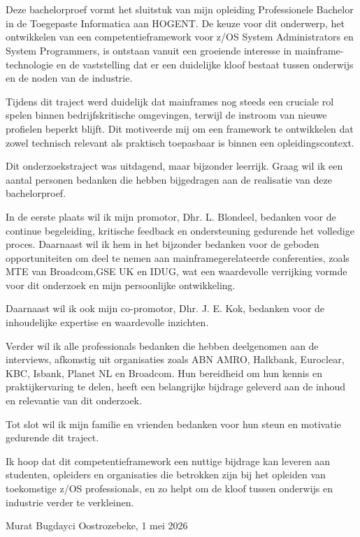 
\chapter*{}%
\label{ch:voorwoord}


Deze bachelorproef vormt het sluitstuk van mijn opleiding Professionele Bachelor in de Toegepaste Informatica aan HOGENT. De keuze voor dit onderwerp, het ontwikkelen van een competentieframework voor z/OS System Administrators en System Programmers, is ontstaan vanuit een groeiende interesse in mainframe-technologie en de vaststelling dat er een duidelijke kloof bestaat tussen onderwijs en de noden van de industrie.

Tijdens dit traject werd duidelijk dat mainframes nog steeds een cruciale rol spelen binnen bedrijfskritische omgevingen, terwijl de instroom van nieuwe profielen beperkt blijft. Dit motiveerde mij om een framework te ontwikkelen dat zowel technisch relevant als praktisch toepasbaar is binnen een opleidingscontext.

Dit onderzoekstraject was uitdagend, maar bijzonder leerrijk. Graag wil ik een aantal personen bedanken die hebben bijgedragen aan de realisatie van deze bachelorproef.

In de eerste plaats wil ik mijn promotor, Dhr. L. Blondeel, bedanken voor de continue begeleiding, kritische feedback en ondersteuning gedurende het volledige proces. Daarnaast wil ik hem in het bijzonder bedanken voor de geboden opportuniteiten om deel te nemen aan mainframegerelateerde conferenties, zoals MTE van Broadcom,GSE UK en IDUG, wat een waardevolle verrijking vormde voor dit onderzoek en mijn persoonlijke ontwikkeling.

Daarnaast wil ik ook mijn co-promotor, Dhr. J. E. Kok, bedanken voor de inhoudelijke expertise en waardevolle inzichten.

Verder wil ik alle professionals bedanken die hebben deelgenomen aan de interviews, afkomstig uit organisaties zoals ABN AMRO, Halkbank, Euroclear, KBC, Isbank, Planet NL en Broadcom. Hun bereidheid om hun kennis en praktijkervaring te delen, heeft een belangrijke bijdrage geleverd aan de inhoud en relevantie van dit onderzoek.

Tot slot wil ik mijn familie en vrienden bedanken voor hun steun en motivatie gedurende dit traject.

Ik hoop dat dit competentieframework een nuttige bijdrage kan leveren aan studenten, opleiders en organisaties die betrokken zijn bij het opleiden van toekomstige z/OS professionals, en zo helpt om de kloof tussen onderwijs en industrie verder te verkleinen.
\vspace{1cm}

\noindent
Murat Bugdayci \hfill Oostrozebeke, 1 mei 2026